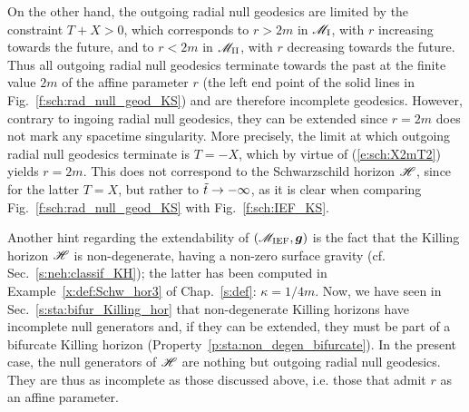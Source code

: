 On the other hand, the outgoing radial null geodesics are limited by
the constraint $T+X > 0$, which corresponds to $r>2m$ in $\mathscr{M}_{\rm I}$, with $r$ increasing towards
the future, and to
$r<2m$ in $\mathscr{M}_{\rm II}$, with $r$ decreasing towards the future.
Thus all outgoing radial null geodesics terminate towards the past at the finite
value $2m$ of the affine parameter $r$
(the left end point of the solid lines in Fig.~\ref{f:sch:rad_null_geod_KS}) and are therefore incomplete geodesics.
However, contrary to ingoing radial null geodesics, they can be extended
since $r=2m$ does not mark any spacetime singularity.
More precisely, the limit at which outgoing radial null geodesics
terminate is $T=-X$, which by virtue of (\ref{e:sch:X2mT2}) yields $r=2m$.
This does not correspond to the Schwarzschild horizon $\mathscr{H}$, since for
the latter $T=X$, but rather to ${\tilde t}\rightarrow-\infty$,
as it is clear when comparing Fig.~\ref{f:sch:rad_null_geod_KS}
with Fig.~\ref{f:sch:IEF_KS}.

Another hint regarding the extendability of $(\mathscr{M}_{\rm IEF}, \bm{g})$
is the fact that the Killing horizon $\mathscr{H}$ is non-degenerate, having
a non-zero surface gravity (cf. Sec.~\ref{s:neh:classif_KH}); the latter
has been computed in Example~\ref{x:def:Schw_hor3} of Chap.~\ref{s:def}:
$\kappa = 1/4m$. Now, we have seen in Sec.~\ref{s:sta:bifur_Killing_hor}
that non-degenerate Killing horizons have incomplete null generators
and, if they can be extended, they must be part of a
bifurcate Killing horizon (Property~\ref{p:sta:non_degen_bifurcate}).
In the present case, the null generators of $\mathscr{H}$
are nothing but outgoing radial null geodesics. They are thus as incomplete
as those discussed above, i.e. those that admit $r$ as an affine parameter.

